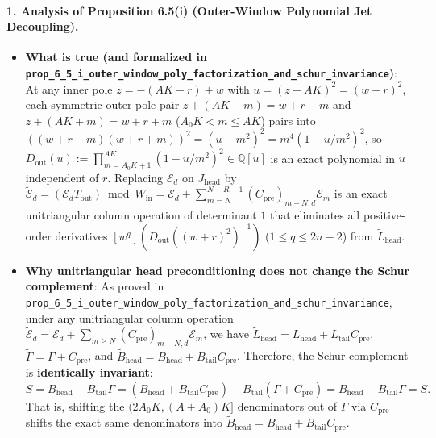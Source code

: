 \documentclass[11pt,a4paper]{article}
\begin{document}
\paragraph{1. Analysis of Proposition 6.5(i) (Outer-Window Polynomial Jet Decoupling).}
\begin{itemize}
  \item \textbf{What is true (and formalized in \texttt{prop\_6\_5\_i\_outer\_window\_poly\_factorization\_and\_schur\_invariance})}:
  At any inner pole $z = -(AK - r) + w$ with $u = (z + AK)^2 = (w + r)^2$, each symmetric outer-pole pair $z + (AK - m) = w + r - m$ and $z + (AK + m) = w + r + m$ ($A_0 K < m \le AK$) pairs into $((w+r-m)(w+r+m))^2 = (u - m^2)^2 = m^4(1 - u/m^2)^2$, so $D_{\mathrm{out}}(u) := \prod_{m=A_0 K+1}^{AK}(1 - u/m^2)^2 \in \mathbb{Q}[u]$ is an exact polynomial in $u$ independent of $r$. Replacing $\mathcal{E}_d$ on $J_{\mathrm{head}}$ by $\widetilde{\mathcal{E}}_d = (\mathcal{E}_d T_{\mathrm{out}}) \bmod W_{\mathrm{in}} = \mathcal{E}_d + \sum_{m=N}^{N+R-1}(C_{\mathrm{pre}})_{m-N, d}\mathcal{E}_m$ is an exact unitriangular column operation of determinant $1$ that eliminates all positive-order derivatives $[w^q](D_{\mathrm{out}}((w+r)^2)^{-1})$ ($1 \le q \le 2n-2$) from $\widetilde{L}_{\mathrm{head}}$.
  \item \textbf{Why unitriangular head preconditioning does not change the Schur complement}:
  As proved in \texttt{prop\_6\_5\_i\_outer\_window\_poly\_factorization\_and\_schur\_invariance}, under any unitriangular column operation $\widetilde{\mathcal{E}}_d = \mathcal{E}_d + \sum_{m \ge N}(C_{\mathrm{pre}})_{m-N,d}\mathcal{E}_m$, we have $\widetilde{L}_{\mathrm{head}} = L_{\mathrm{head}} + L_{\mathrm{tail}}C_{\mathrm{pre}}$, $\widetilde{\Gamma} = \Gamma + C_{\mathrm{pre}}$, and $\widetilde{B}_{\mathrm{head}} = B_{\mathrm{head}} + B_{\mathrm{tail}}C_{\mathrm{pre}}$. Therefore, the Schur complement is \textbf{identically invariant}:
  \[
    \widetilde{S} = \widetilde{B}_{\mathrm{head}} - B_{\mathrm{tail}}\widetilde{\Gamma} = (B_{\mathrm{head}} + B_{\mathrm{tail}}C_{\mathrm{pre}}) - B_{\mathrm{tail}}(\Gamma + C_{\mathrm{pre}}) = B_{\mathrm{head}} - B_{\mathrm{tail}}\Gamma = S.
  \]
  That is, shifting the $(2A_0 K, (A+A_0)K]$ denominators out of $\Gamma$ via $C_{\mathrm{pre}}$ shifts the exact same denominators into $\widetilde{B}_{\mathrm{head}} = B_{\mathrm{head}} + B_{\mathrm{tail}}C_{\mathrm{pre}}$.
\end{itemize}
\end{document}
